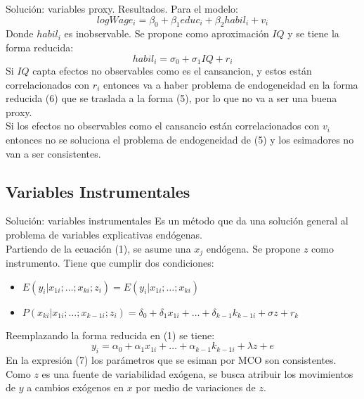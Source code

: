 \documentclass{beamer}
\begin{document}
\begin{frame}{Soluci\'on: variables proxy. Resultados.}
Para el modelo:
\begin{equation}
    logWage_i= \beta_0+\beta_1educ_i+\beta_2habil_i+ v _i
\end{equation}
Donde $habil_i$ es inobservable. Se propone como aproximaci\'on $IQ$ y se tiene la forma reducida:
\begin{equation}
    habil_i=\sigma_0 + \sigma_1IQ+ r_i
\end{equation}
Si $IQ$ capta efectos no observables como es el cansancion, y estos est\'an correlacionados con $r_i$ entonces va a haber problema de endogeneidad en la forma reducida (6) que se traslada a la forma (5), por lo que no va a ser una buena proxy.\\
Si los efectos no observables como el cansancio están correlacionados con $v_i$ entonces no se soluciona el problema de endogeneidad de (5) y los esimadores no van a ser consistentes.
\end{frame}

\subsection{Variables Instrumentales}
\begin{frame}{Soluci\'on: variables instrumentales}
Es un m\'etodo que da una soluci\'on general al problema de variables explicativas end\'ogenas.\\
Partiendo de la ecuaci\'on (1), se asume una $x_j$ end\'ogena. Se propone $z$ como instrumento. Tiene que cumplir dos condiciones:
\begin{itemize}
    \item $E(y_i|x_{1i};\dots;x_{ki};z_i)=E(y_i|x_{1i};\dotsc;x_{ki})$
    \item $P(x_{ki}|x_{1i};\dotsc;x_{k-1i};z_i)=\delta_0+\delta_1x_{1i}+\dots+\delta_{k-1}k_{k-1i}+\sigma z + r_k$
\end{itemize}
Reemplazando la forma reducida en (1) se tiene:
\begin{equation}
   y_i= \alpha_0+\alpha_1x_{1i}+\dots+\alpha_{k-1}k_{k-1i}+\lambda z + e
\end{equation}
En la expresi\'on (7) los par\'ametros que se esiman por MCO son consistentes.
Como $z$ es una fuente de variabilidad ex\'ogena, se busca atribuir los movimientos de $y$ a cambios ex\'ogenos en $x$ por medio de variaciones de $z$.
\end{frame}
\end{document}
